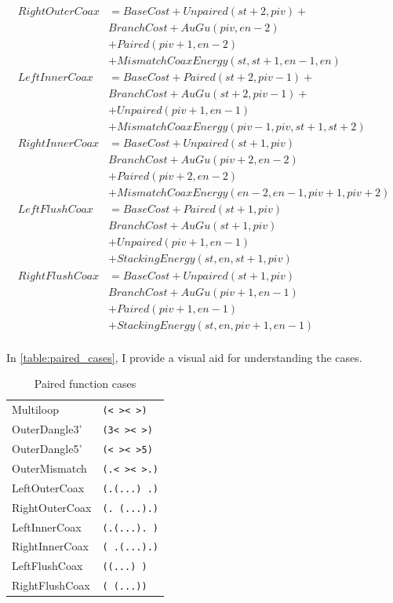\documentclass{cshonours}
\begin{document}
\begin{align*}
RightOuterCoax &= BaseCost + Unpaired(st + 2, piv) + \\
  &BranchCost + AuGu(piv, en - 2) \\
  &+ Paired(piv + 1, en - 2) \\
  &+ MismatchCoaxEnergy(st, st + 1, en - 1, en) \\
LeftInnerCoax &= BaseCost + Paired(st + 2, piv - 1) + \\
  &BranchCost + AuGu(st + 2, piv - 1) + \\
  &+ Unpaired(piv + 1, en - 1) \\
  &+ MismatchCoaxEnergy(piv - 1, piv, st + 1, st + 2) \\
RightInnerCoax &= BaseCost + Unpaired(st + 1, piv) \\
  &BranchCost + AuGu(piv + 2, en - 2) \\
  &+ Paired(piv + 2, en - 2) \\
  &+ MismatchCoaxEnergy(en - 2, en - 1, piv + 1, piv + 2) \\
LeftFlushCoax &= BaseCost + Paired(st + 1, piv) \\
  &BranchCost + AuGu(st + 1, piv) \\
  &+ Unpaired(piv + 1, en - 1) \\
  &+ StackingEnergy(st, en, st + 1, piv) \\
RightFlushCoax &= BaseCost + Unpaired(st + 1, piv) \\
  &BranchCost + AuGu(piv + 1, en - 1) \\
  &+ Paired(piv + 1, en - 1) \\
  &+ StackingEnergy(st, en, piv + 1, en - 1) \\
\end{align*}

In \autoref{table:paired_cases}, I provide a visual aid for understanding the cases.

\begin{table}[H]
\begin{adjustbox}{center}
\begin{tabular}{ll}
Multiloop & \texttt{(<   ><   >)} \\
OuterDangle3' & \texttt{(3<   ><   >)} \\
OuterDangle5' & \texttt{(<   ><   >5) } \\
OuterMismatch & \texttt{(.<   ><   >.)} \\
LeftOuterCoax & \texttt{(.(...)   .)} \\
RightOuterCoax & \texttt{(.   (...).)} \\
LeftInnerCoax & \texttt{(.(...).   )} \\
RightInnerCoax & \texttt{(   .(...).)} \\
LeftFlushCoax & \texttt{((...)   )} \\
RightFlushCoax & \texttt{(   (...))} \\
\end{tabular}
\end{adjustbox}
\caption{Paired function cases}
\label{table:paired_cases}
\end{table}
\end{document}
